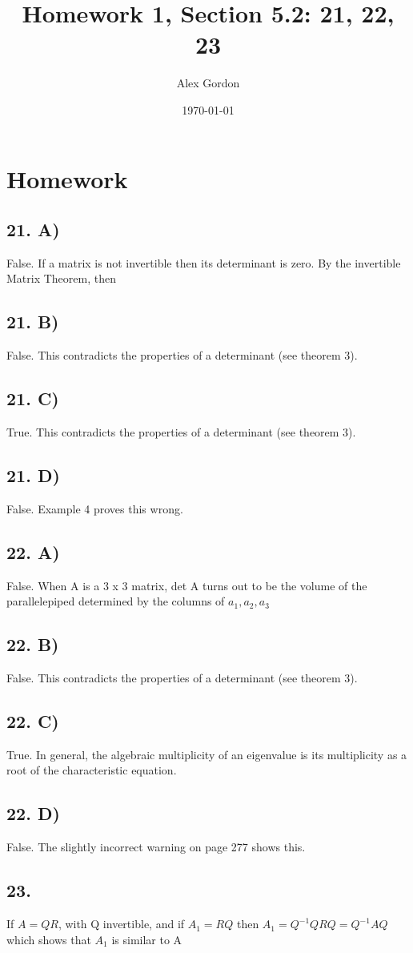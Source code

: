 \documentclass[12]{scrartcl}
\begin{document}
\title{Homework 1, Section 5.2: 21, 22, 23}
\author{Alex Gordon}
\date{\today}
\maketitle
\section*{Homework}
\subsection*{21. A)}
False. If a matrix is not invertible then its determinant is zero. By the invertible Matrix Theorem, then 
\subsection*{21. B)}
False. This contradicts the properties of a determinant (see theorem 3).
\subsection*{21. C)}
True. This contradicts the properties of a determinant (see theorem 3).
\subsection*{21. D)}
False. Example 4 proves this wrong. 

\subsection*{22. A)}
False. When A is a 3 x 3 matrix, det A turns out to be the volume of the parallelepiped determined by the columns of $a_1, a_2, a_3$
\subsection*{22. B)}
False. This contradicts the properties of a determinant (see theorem 3).
\subsection*{22. C)}
True. In general, the algebraic multiplicity of an eigenvalue is its multiplicity as a root of the characteristic equation. 
\subsection*{22. D)}
False. The slightly incorrect warning on page 277 shows this. 

\subsection*{23.}
If $A = QR$, with Q invertible, and if $A_1 = RQ$ then $A_1 = Q^{-1}QRQ = Q^{-1} AQ$ which shows that $A_1$ is similar to A
\end{document}
